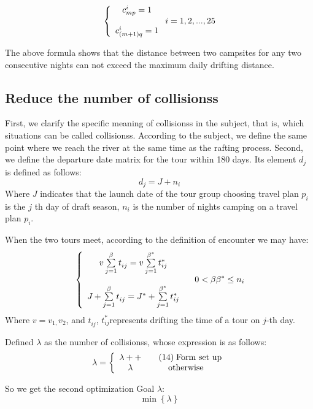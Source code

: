 	\begin{equation}
	\left\{ {\begin{array}{*{20}{c}}
		{c_{mp}^i = 1}\\
		\\
		{c_{(m + 1)q}^i = 1}
		\end{array}} \right.{\rm{        }}i = 1,2,...,25\label{aa1}
	\end{equation}
	\par The above formula shows that the distance between two campsites for any two consecutive nights can not exceed the maximum daily drifting distance.

\subsection{Reduce the number of collisionss}
\label{subsection:5.2subsection}
First, we clarify the specific meaning of collisionss in the subject, that is, which situations can be called collisionss. According to the subject, we define the same point where we reach the river at the same time as the rafting process. Second, we define the departure date matrix for the tour within 180 days. Its element $d_j^{}$ is defined as follows: 
	\begin{equation}
	{d_j} = J + {n_i}\label{aa1}
	\end{equation}
	Where $J$ indicates that the launch date of the tour group choosing travel plan ${p_i}$ is the $j$ th day of draft season, ${n_i}$ is the number of nights camping on a travel plan ${p_i}$.
	\par When the two tours meet, according to the definition of encounter we may have:
	\begin{equation}
	{\rm{   }}\left\{ {\begin{array}{*{20}{c}}
		{v\sum\limits_{j = 1}^\beta  {t_{ij}^{} = v\sum\limits_{j = 1}^{{\beta ^ * }} {t_{ij}^ * } } }&{}\\
		\\
		{{J_{}} + \sum\limits_{j = 1}^\beta  {t_{ij}^{}}  = {J^ * } + \sum\limits_{j = 1}^{{\beta ^ * }} {t_{ij}^ * } }&{}
		\end{array}} \right.0 < \beta {\beta ^ * } \le {n_i}\label{aa1}
	\end{equation}
	Where $v = {v_{1,}}{v_2}$, and $t_{ij}^{}$, $t_{ij}^ * $represents drifting the time of a tour on $j$-th day.
	\par Defined $\lambda $ as the number of collisionss, whose expression is as follows:
	\begin{equation}
	\lambda  = \left\{ {\begin{array}{*{20}{c}}
		{\lambda  +  + }&{{\rm{  \quad    (14)\; Form\ set\ up}}}\\
		\lambda &{{\rm{otherwise}}}
		\end{array}} \right.\label{aa1}
	\end{equation}
	\par So we get the second optimization Goal $\lambda $:
	\begin{equation}
	\min \left\{ \lambda  \right\}\label{aa1}
	\end{equation}
	

